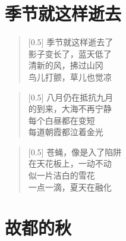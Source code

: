 \documentclass[12pt,UTF-8,openany]{ctexbook}
\begin{document}
\chapter{季节就这样逝去}

\begin{normalsize}
    
    \begin{verse}[0.5\linewidth]
        季节就这样逝去了 \\
        影子变长了，蓝天低了 \\
        清新的风，拂过山冈 \\
        鸟儿打颤，草儿也觉凉
    \end{verse}
    
    
    \begin{verse}[0.5\linewidth]
        八月仍在抵抗九月 \\
        的到来，大海不再宁静 \\
        每个白昼都在变短 \\
        每道朝霞都泣着金光
    \end{verse}
    
    
    \begin{verse}[0.5\linewidth]
        苍蝇，像是入了陷阱 \\
        在天花板上，一动不动 \\
        似一片洁白的雪花 \\
        一点一滴，夏天在融化
    \end{verse}
    
\end{normalsize}



\chapter{故都的秋}
\end{document}
